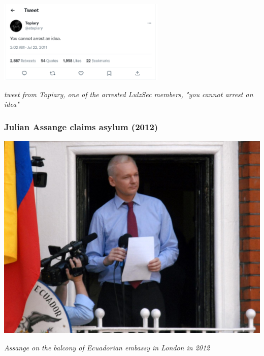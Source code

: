 \documentclass[aspectratio=169,usenames,dvipsnames]{beamer}
\begin{document}
\begin{frame}[c]

  \centering

  \includegraphics[width=0.6\textwidth,height=0.6\textheight,keepaspectratio]{img/cant_arrest_an_idea.png}

  \vfill

  \footnotesize
  \emph{tweet from Topiary, one of the arrested LulzSec members, "you cannot
  arrest an idea"}
\end{frame}

\begin{frame}[c]
  \frametitle{Julian Assange claims asylum (2012)}

  \centering
  \includegraphics[width=\textwidth,height=0.5\textheight,keepaspectratio]{img/julian_embassy.jpg}

  \vspace{5mm}

  \footnotesize
  \emph{Assange on the balcony of Ecuadorian embassy in London in 2012}
\end{frame}
\end{document}
